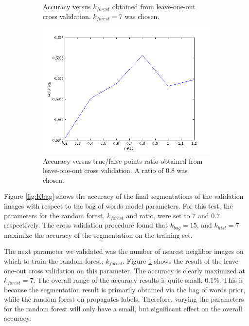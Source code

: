 \documentclass{article} %
\begin{document}
\begin{figure}[htb]
\begin{subfigure}[t]{0.33\textwidth}
		\parbox{0.95\textwidth}{\caption{Accuracy versus $k_{forest}$ obtained from leave-one-out cross validation. $k_{forest} = 7$ was chosen. \label{fig:Kforest}}}
	\end{subfigure}
	\begin{subfigure}[t]{0.33\textwidth}
		\centering
		\includegraphics[width = \textwidth]{./img/ratio}
		\parbox{0.95\textwidth}{\caption{Accuracy versus true/false points ratio obtained from leave-one-out cross validation. A ratio  of 0.8 was chosen. \label{fig:ratio}}}
	\end{subfigure}
	\caption{}
\end{figure}

Figure \ref{fig:Kbag} shows the accuracy of the final segmentations of the validation images with respect to the bag of words model parameters. 
For this test, the parameters for the random forest, $k_{forest}$ and ratio, were set to 7 and 0.7 respectively. 
The cross validation procedure found that $k_{bag} = 15$, and $k_{hist} = 7$ maximize the accuracy of the segmentation on the training set.

The next parameter we validated was the number of nearest neighbor images on which to train the random forest, $k_{forest}$. 
	Figure \ref{fig:Kforest} shows the result of the leave-one-out cross validation on this parameter. The accuracy is clearly maximized at $k_{forest} = 7$. The overall range of the accuracy results is quite small, $0.1\%$. This is because the segmentation result is primarily obtained via the bag of words prior, while the random forest on propagates labels. Therefore, varying the parameters for the random forest will only have a small, but significant effect on the overall accuracy.
\end{document}
